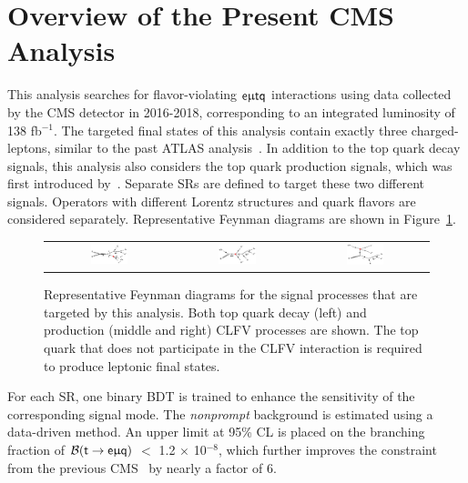 \section{Overview of the Present CMS Analysis}
\label{sec:CLFV_This}

This analysis searches for flavor-violating $\textsf{e}\upmu\textsf{t{q}}$ interactions using data collected by the \ac{CMS} detector in 2016-2018, corresponding to an integrated luminosity of 138 fb$^{-1}$. The targeted final states of this analysis contain exactly three charged-leptons, similar to the past ATLAS analysis~\cite{ATLAS-CONF-2018-044}. In addition to the top quark decay signals, this analysis also considers the top quark production signals, which was first introduced by~\cite{CMS:2022ztx}. Separate \acp{SR} are defined to target these two different signals. Operators with different Lorentz structures and quark flavors are considered separately. Representative Feynman diagrams are shown in Figure~\ref{fig:CMS_FD_This}. 
 
\begin{figure}[tbh!]
 \begin{center}
 \begin{tabular}{ccc}
 \includegraphics[width=0.31\textwidth]{figures/Part3/History/TT}&
 \includegraphics[width=0.33\textwidth]{figures/Part3/History/ST1}&
 \includegraphics[width=0.31\textwidth]{figures/Part3/History/ST2}\\
 \end{tabular}
 \caption{Representative Feynman diagrams for the signal processes that are targeted by this analysis. Both top quark decay (left) and production (middle and right) \ac{CLFV} processes are shown. The top quark that does not participate in the \ac{CLFV} interaction is required to produce leptonic final states.}
 \label{fig:CMS_FD_This}
 \end{center}
 \end{figure}
 
For each \ac{SR}, one binary \ac{BDT} is trained to enhance the sensitivity of the corresponding signal mode. The \emph{nonprompt} background is estimated using a data-driven method. An upper limit at 95\% \ac{CL} is placed on the branching fraction of $\mathcal{B}(\textsf{t}\rightarrow\textsf{e}\upmu\textsf{q})$ $<$ 1.2 $\times$ 10$^{-8}$, which further improves the constraint from the previous \ac{CMS}~\cite{CMS:2022ztx} by nearly a factor of 6.